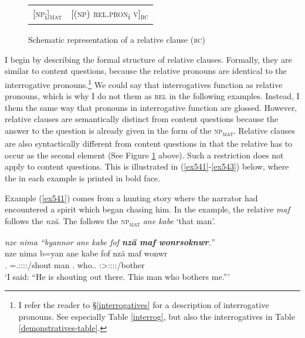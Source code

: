 \begin{figure}[H]
\begin{center}
	\begin{tabularx}{\textwidth}{Xl}
			[\textsc{np}\textsubscript{i}]\textsubscript{\textsc{mat}}& [(\textsc{np}) \textsc{rel.pron}\textsubscript{i} \textsc{v}]\textsubscript{\textsc{rc}}\\
	\end{tabularx}
	\caption{Schematic representation of a relative clause (\textsc{rc})}
	\label{relclause}
\end{center}
\end{figure}%

I begin by describing the formal structure of relative clauses. Formally, they are similar to content questions, because the relative pronouns are identical to the interrogative pronouns.\footnote{I refer the reader to \S{}\ref{interrogatives} for a description of interrogative pronouns. See especially Table \ref{interrog}, but also the interrogatives in Table \ref{demonstratives-table}.} We could say that interrogatives function as relative pronouns, which is why I do not  them as \textsc{rel} in the following examples. Instead, I  them the same way that pronouns in interrogative function are glossed. However, relative clauses are semantically distinct from content questions because the answer to the question is already given in the form of the \textsc{np}\textsubscript{\textsc{mat}}. Relative clauses are also syntactically different from content questions in that the relative  has to occur as the second element (See Figure \ref{relclause} above). Such a restriction does not apply to content questions. This is illustrated in (\ref{ex541}-\ref{ex543}) below, where the  in each example is printed in bold face.%

Example (\ref{ex541}) comes from a hunting story where the narrator had encountered a spirit which began chasing him. In the example, the relative  \emph{maf} follows the  \emph{nzä}. The  follows the \textsc{np}\textsubscript{\textsc{mat}} \emph{ane kabe} `that man'.

\begin{exe}
	\ex \emph{nze nima ``byannor ane kabe fof \textbf{nzä maf wonrsoknwr}.''}\\
	\gll nze nima b=yan ane kabe fof nzä maf wonwr\\
	\Fsg.\Erg{} \Quot{} \Med=\Tsg.\Masc:\Sbj:\Nonpast:\Ipfv:\Venit/shout \Dem{} man \Emph{} \Fsg.\Abs{} who.\Sg.\Erg{} \Stsg:\Sbj>\Fsg:\Obj:\Nonpast:\Ipfv:\Venit/bother\\
	\trans `I said: ``He is shouting out there. This man who bothers me.'''\\
	\label{ex541}
\end{exe}

